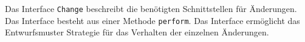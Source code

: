 Das Interface \verb#Change# beschreibt die benötigten Schnittstellen für Änderungen.
Das Interface besteht aus einer Methode \verb#perform#.
Das Interface ermöglicht das Entwurfsmuster Strategie für das Verhalten der einzelnen Änderungen.